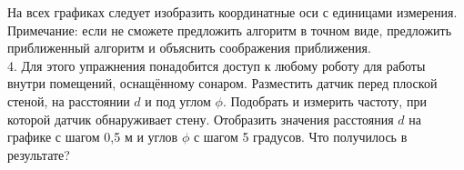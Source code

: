 \documentclass[10pt,a4paper]{article}
\begin{document}
На всех графиках следует изобразить координатные оси с единицами измерения. Примечание: если не сможете предложить алгоритм в точном виде, предложить приближенный алгоритм и объяснить соображения приближения. \\

4. Для этого упражнения понадобится доступ к любому роботу для работы внутри помещений, оснащённому сонаром. Разместить датчик перед плоской стеной, на расстоянии $d$ и под углом $\phi$. Подобрать и измерить частоту, при которой датчик обнаруживает стену. Отобразить значения расстояния $d$ на графике с шагом 0,5 м и углов $\phi$ с шагом 5 градусов. Что получилось в результате?
\end{document}
